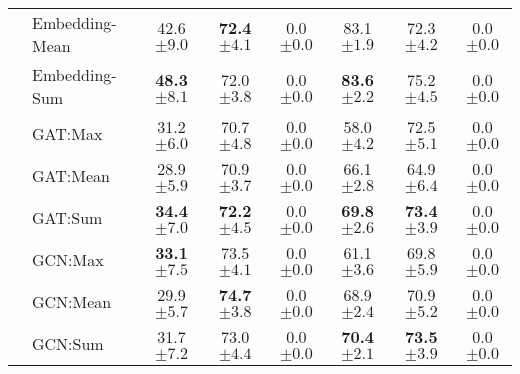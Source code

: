 \begin{table}
{\begin{tabular}{@{}c <{\enspace}@{}lcccccc@{}}
			& \textsf{Embedding-Mean}     & 42.6 \scriptsize	$\pm 9.0$ & \textbf{72.4}     \scriptsize $\pm 4.1 $         & 0.0 \scriptsize $\pm 0.0$            & 83.1   \scriptsize $\pm 1.9$         & 72.3  \scriptsize $\pm 4.2$         &  0.0 \scriptsize $\pm 0.0$                     
			\\ 
			& \textsf{Embedding-Sum} & \textbf{48.3} \scriptsize	$\pm 8.1$          & 72.0  \scriptsize $\pm 3.8$             & 0.0 \scriptsize $\pm 0.0$            & \textbf{83.6}   \scriptsize $\pm 2.2$         & 75.2  \scriptsize $\pm 4.5$   	& 0.0  \scriptsize $\pm 0.0$                     
			\\ 
			\cmidrule{2-8}
			\multirow{9}{*}{\rotatebox{90}{Graph Neural Networks}} 
			& \textsf{GAT:Max}                    & 31.2 \scriptsize $\pm 6.0$        & 70.7 \scriptsize $\pm 4.8$          & 0.0 \scriptsize $\pm 0.0$            & 58.0 \scriptsize $\pm 4.2$          & 72.5 \scriptsize $\pm 5.1$         & 0.0 \scriptsize $\pm 0.0$  
			\\ 
			& \textsf{GAT:Mean}    & 28.9 \scriptsize $\pm 5.9$          & 70.9 \scriptsize $\pm 3.7$           & 0.0 \scriptsize $\pm 0.0$            & 66.1 \scriptsize $\pm 2.8$         & 64.9 \scriptsize $\pm 6.4$       & 0.0 \scriptsize $\pm 0.0$
			\\ 
			& \textsf{GAT:Sum}                  & \textbf{34.4} \scriptsize $\pm 7.0$          & \textbf{72.2} \scriptsize $\pm 4.5$	            & 0.0 \scriptsize $\pm 0.0$            & \textbf{69.8} \scriptsize $\pm 2.6$	          & \textbf{73.4} \scriptsize $\pm 3.9$
			& 0.0 \scriptsize $\pm 0.0$          
			\\
			
			\cmidrule{2-8}
					
			& \textsf{GCN:Max} & \textbf{33.1} \scriptsize $\pm 7.5$ &	73.5 \scriptsize $\pm 4.1$	& 0.0 \scriptsize $\pm 0.0$ & 61.1 \scriptsize $\pm 3.6$ &	69.8 \scriptsize $\pm 5.9$ & 0.0 \scriptsize $\pm 0.0$  
			\\ 
			& \textsf{GCN:Mean} & 29.9 \scriptsize $\pm 5.7$ &	\textbf{74.7} \scriptsize $\pm 3.8$ & 0.0 \scriptsize $\pm 0.0$ &	68.9 \scriptsize $\pm 2.4$ &	70.9 \scriptsize $\pm 5.2$ & 0.0 \scriptsize $\pm 0.0$
			\\ 
			& \textsf{GCN:Sum} & 31.7 \scriptsize $\pm 7.2$ &	73.0 \scriptsize $\pm 4.4$	& 0.0 \scriptsize $\pm 0.0$ & \textbf{70.4} \scriptsize $\pm 2.1$ & \textbf{73.5} \scriptsize $\pm 3.9$ & 0.0 \scriptsize $\pm 0.0$                        
			\\
			\cmidrule{2-8}	
						

\end{tabular}}
\end{table}
